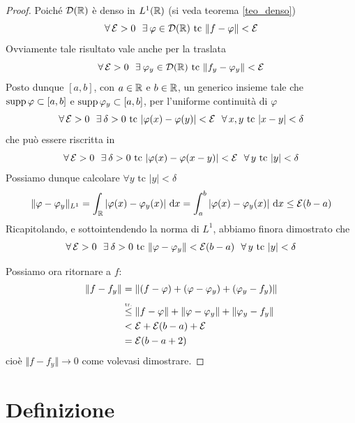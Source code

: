 \begin{proof}
Poiché $\mathcal{D}(\mathbb{R})$ è denso in $L^1(\mathbb{R})$ (si veda teorema \ref{teo_denso})
\begin{equation*}
\forall\Ec>0\ \ \exists\varphi\in\Dc(\RR)\text{ tc } \Vert f-\varphi\Vert<\Ec
\end{equation*}
Ovviamente tale risultato vale anche per la traslata
\begin{equation*}
\forall\Ec>0\ \ \exists\varphi_y\in\Dc(\RR)\text{ tc } \Vert f_y-\varphi_y\Vert<\Ec
\end{equation*}
Posto dunque $[a,b]$, con $a\in\mathbb{R}$ e $b\in\mathbb{R}$, un generico insieme tale che $\operatorname*{supp}\varphi\subset[a,b]$ e $\operatorname*{supp}\varphi_y\subset[a,b]$, per l'uniforme continuità di $\varphi$
\begin{equation*}
\forall\Ec>0\ \ \exists\delta>0\text{ tc }|\varphi(x)-\varphi(y)|<\Ec\ \ \forall x,y\text{ tc }|x-y|<\delta
\end{equation*}
che può essere riscritta in
\begin{equation*}
\forall\Ec>0\ \ \exists\delta>0\text{ tc }|\varphi(x)-\varphi(x-y)|<\Ec\ \ \forall y\text{ tc }|y|<\delta
\end{equation*}
Possiamo dunque calcolare $\forall y\text{ tc }|y|<\delta$
\begin{equation*}
\Vert\varphi-\varphi_y\Vert_{L^1}=\int_{\mathbb{R}} |\varphi(x)-\varphi_y(x)|\  \mathrm{d} x=\int_a^b |\varphi(x)-\varphi_y(x)|\  \mathrm{d} x\leq \mathcal{E}(b-a)
\end{equation*}
Ricapitolando, e sottointendendo la norma di $L^1$, abbiamo finora dimostrato che
\begin{equation*}
\forall\Ec>0\ \ \exists\delta>0\text{ tc }\Vert\varphi-\varphi_y\Vert<\Ec(b-a)\ \ \forall y\text{ tc }|y|<\delta
\end{equation*}

Possiamo ora ritornare a $f$:
\begin{align*}
\Vert f - f_y \Vert & = \Vert (f - \varphi) + (\varphi - \varphi_y) + (\varphi_y - f_y) \Vert \\
  &\overset{\underset{\mathrm{tr.}}{}}{\leq} \Vert f - \varphi \Vert + \Vert \varphi - \varphi_y \Vert + \Vert \varphi_y - f_y \Vert \\
 & < \mathcal{E} +\mathcal{E}(b-a) + \mathcal{E} \\
 & =\mathcal{E}(b-a+2)
\end{align*}
cioè $ \Vert f - f_y \Vert \to 0$ come volevasi dimostrare.
\end{proof}


\section{Definizione}

